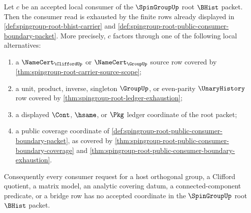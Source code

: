 \begin{lemma}
\label{lem:spingroup-root-local-consumer-downstream-coverage}
Let $c$ be an accepted local consumer of the $\SpinGroupUp$ root $\BHist$ packet. Then the consumer read is exhausted by the finite rows already displayed in \autoref{def:spingroup-root-bhist-carrier} and \autoref{def:spingroup-root-public-consumer-boundary-packet}. More precisely, $c$ factors through one of the following local alternatives:
\begin{enumerate}
\item a $\NameCert_{\CliffordUp}$ or $\NameCert_{\GroupUp}$ source row covered by \autoref{thm:spingroup-root-carrier-source-scope};
\item a unit, product, inverse, singleton $\GroupUp$, or even-parity $\UnaryHistory$ row covered by \autoref{thm:spingroup-root-ledger-exhaustion};
\item a displayed $\Cont$, $\hsame$, or $\Pkg$ ledger coordinate of the root packet;
\item a public coverage coordinate of \autoref{def:spingroup-root-public-consumer-boundary-packet}, as covered by \autoref{thm:spingroup-root-public-consumer-boundary-coverage} and \autoref{thm:spingroup-root-public-consumer-boundary-exhaustion}.
\end{enumerate}
Consequently every consumer request for a host orthogonal group, a Clifford quotient, a matrix model, an analytic covering datum, a connected-component predicate, or a bridge row has no accepted coordinate in the $\SpinGroupUp$ root $\BHist$ packet.
\end{lemma}
